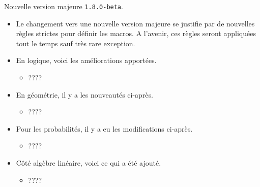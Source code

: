 Nouvelle version majeure \verb+1.8.0-beta+.

\begin{itemize}[itemsep=.5em]
    \item Le changement vers une nouvelle version majeure se justifie par de nouvelles règles strictes pour définir les macros. A l'avenir, ces règles seront appliquées tout le temps sauf très rare exception.




    \item En logique, voici les améliorations apportées.
    \begin{itemize}[itemsep=.5em]
        \item ????
    \end{itemize}




    \item En géométrie, il y a les nouveautés ci-après.
    \begin{itemize}[itemsep=.5em]
        \item ????
    \end{itemize}




    \item Pour les probabilités, il y a eu les modifications ci-après.
    \begin{itemize}[itemsep=.5em]
        \item ????
    \end{itemize}




    \item Côté algèbre linéaire, voici ce qui a été ajouté.
    \begin{itemize}[itemsep=.5em]
        \item ????
    \end{itemize}
\end{itemize}
